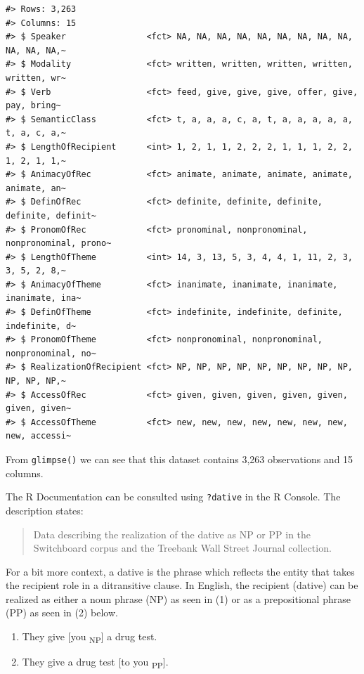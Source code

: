 \documentclass[
  letterpaper,
]{scrbook}
\providecommand{\tightlist}{%
  \setlength{\itemsep}{0pt}\setlength{\parskip}{0pt}}\usepackage{longtable,booktabs,array}
\begin{document}
\begin{verbatim}
#> Rows: 3,263
#> Columns: 15
#> $ Speaker                <fct> NA, NA, NA, NA, NA, NA, NA, NA, NA, NA, NA, NA,~
#> $ Modality               <fct> written, written, written, written, written, wr~
#> $ Verb                   <fct> feed, give, give, give, offer, give, pay, bring~
#> $ SemanticClass          <fct> t, a, a, a, c, a, t, a, a, a, a, a, t, a, c, a,~
#> $ LengthOfRecipient      <int> 1, 2, 1, 1, 2, 2, 2, 1, 1, 1, 2, 2, 1, 2, 1, 1,~
#> $ AnimacyOfRec           <fct> animate, animate, animate, animate, animate, an~
#> $ DefinOfRec             <fct> definite, definite, definite, definite, definit~
#> $ PronomOfRec            <fct> pronominal, nonpronominal, nonpronominal, prono~
#> $ LengthOfTheme          <int> 14, 3, 13, 5, 3, 4, 4, 1, 11, 2, 3, 3, 5, 2, 8,~
#> $ AnimacyOfTheme         <fct> inanimate, inanimate, inanimate, inanimate, ina~
#> $ DefinOfTheme           <fct> indefinite, indefinite, definite, indefinite, d~
#> $ PronomOfTheme          <fct> nonpronominal, nonpronominal, nonpronominal, no~
#> $ RealizationOfRecipient <fct> NP, NP, NP, NP, NP, NP, NP, NP, NP, NP, NP, NP,~
#> $ AccessOfRec            <fct> given, given, given, given, given, given, given~
#> $ AccessOfTheme          <fct> new, new, new, new, new, new, new, new, accessi~
\end{verbatim}

From \texttt{glimpse()} we can see that this dataset contains 3,263
observations and 15 columns.

The R Documentation can be consulted using \texttt{?dative} in the R
Console. The description states:

\begin{quote}
Data describing the realization of the dative as NP or PP in the
Switchboard corpus and the Treebank Wall Street Journal collection.
\end{quote}

For a bit more context, a dative is the phrase which reflects the entity
that takes the recipient role in a ditransitive clause. In English, the
recipient (dative) can be realized as either a noun phrase (NP) as seen
in (1) or as a prepositional phrase (PP) as seen in (2) below.

\begin{enumerate}
\def\labelenumi{\arabic{enumi}.}
\tightlist
\item
  They give {[}you \textsubscript{NP}{]} a drug test.
\item
  They give a drug test {[}to you \textsubscript{PP}{]}.
\end{enumerate}
\end{document}
